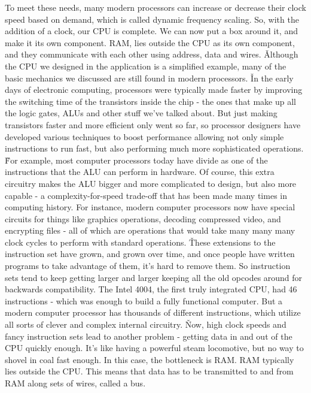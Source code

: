 To meet these needs, many modern processors can increase or decrease their clock speed based on demand, which is
called dynamic frequency scaling. So, with the addition of a clock, our CPU is complete. We can now put a box around
it, and make it its own component. RAM, lies outside the CPU as its own component, and they communicate with each other
using address, data and wires. \v

Although the CPU we designed in the application is a simplified example, many of the basic mechanics we discussed are
still found in modern processors. \v

In the early days of electronic computing, processors were typically made faster by improving the switching time of
the transistors inside the chip - the ones that make up all the logic gates, ALUs and other stuff we've talked about.
But just making transistors faster and more efficient only went so far, so processor designers have developed
various techniques to boost performance allowing not only simple instructions to run fast, but also performing much
more sophisticated operations. \v

For example, most computer processors today have divide as one of the instructions that the ALU can perform in
hardware. Of course, this extra circuitry makes the ALU bigger and more complicated to design, but also more capable
- a complexity-for-speed trade-off that has been made many times in computing history. For instance, modern computer
processors now have special circuits for things like graphics operations, decoding compressed video, and encrypting
files - all of which are operations that would take many many many clock cycles to perform with standard operations. \v

These extensions to the instruction set have grown, and grown over time, and once people have written programs to
take advantage of them, it's hard to remove them. So instruction sets tend to keep getting larger and larger keeping
all the old opcodes around for backwards compatibility. The Intel 4004, the first truly integrated CPU, had 46
instructions - which was enough to build a fully functional computer. But a modern computer processor has thousands
of different instructions, which utilize all sorts of clever and complex internal circuitry. \v

Now, high clock speeds and fancy instruction sets lead to another problem - getting data in and out of the CPU
quickly enough. It's like having a powerful steam locomotive, but no way to shovel in coal fast enough. In this case,
the bottleneck is RAM. RAM typically lies outside the CPU. This means that data has to be transmitted to and from RAM
along sets of wires, called a bus.

